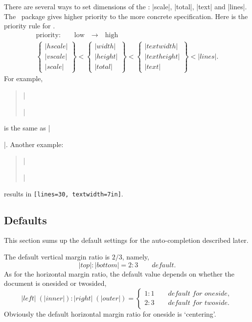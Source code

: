  There are several ways to set dimensions of the :
 |scale|, |total|, |text| and |lines|. The \Gm\ package gives higher
 priority to the more concrete specification. Here is the priority
 rule for .
 \[\begin{array}{c}
 \textrm{priority:}\qquad\textrm{low}\quad
    \longrightarrow\quad\textrm{high}\\[1em]
 \left\{\begin{array}{l}|hscale|\\|vscale|\\|scale|
        \end{array}\right\} <
 \left\{\begin{array}{l}|width|\\|height|\\|total|
        \end{array}\right\} <
 \left\{\begin{array}{l}|textwidth|\\|textheight|
         \\|text|\end{array}\right\} < |lines|.
 \end{array}\]
 For example, 
 \begin{quote}
  |\usepackage[hscale=0.8, textwidth=7in, width=18cm]{geometry}|
 \end{quote}
 is the same as |\usepackage[textwidth=7in]{geometry}|. Another example:
 \begin{quote}
  |\usepackage[lines=30, scale=0.8, text=7in]{geometry}|
 \end{quote}
 results in \texttt{[lines=30, textwidth=7in]}.

 \subsection{Defaults}\label{sec:defaults}

 This section sums up the default settings for the auto-completion
 described later.
 
 The default vertical margin ratio is $2/3$, namely,
 \begin{equation}
  |top| : |bottom| = 2 : 3 \qquad\textit{default}.
 \end{equation}
 As for the horizontal margin ratio, the default value depends on
 whether the document is onesided or twosided,
 \begin{equation}
  |left|\;(|inner|) : |right|\;(|outer|) 
       = \left\{ \begin{array}{ll}
              1 : 1 \qquad\textit{default for oneside},\\
              2 : 3 \qquad\textit{default for twoside}.
         \end{array}\right.
 \end{equation}
 Obviously the default horizontal margin ratio for oneside is `centering'.

